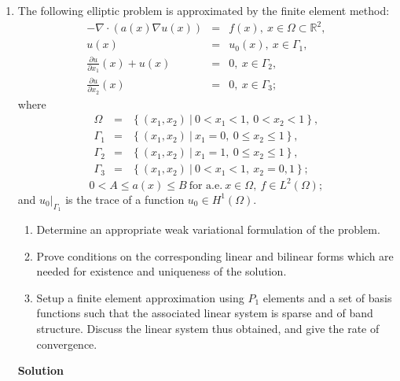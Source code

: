 \documentclass{article}
\begin{document}
\begin{enumerate}
\begin{enumerate}
\end{enumerate}



\item The following elliptic problem is approximated by the finite element method:
\begin{eqnarray*}
-\nabla \cdot \left( a(x) \nabla u(x) \right) & = & f(x), \ x \in \Omega \subset \mathbb{R}^2, \\
u(x) & = & u_0(x), \ x \in \Gamma_1, \\
\frac{\partial u}{\partial x_1}(x) + u(x) & = & 0, \ x \in \Gamma_2, \\
\frac{\partial u}{\partial x_2}(x) & = & 0, \ x \in \Gamma_3;
\end{eqnarray*}
where
\begin{eqnarray*}
\Omega & = & \left\{ (x_1,x_2) \ | \ 0 < x_1 < 1, \ 0 < x_2 < 1 \right\}, \\
\Gamma_1 & = & \left\{ (x_1,x_2) \ | \ x_1 = 0, \ 0 \leq x_2 \leq 1 \right\}, \\
\Gamma_2 & = & \left\{ (x_1,x_2) \ | \ x_1 = 1, \ 0 \leq x_2 \leq 1 \right\}, \\
\Gamma_3 & = & \left\{ (x_1,x_2) \ | \ 0 < x_1 < 1, \ x_2 = 0,1 \right\};
\end{eqnarray*}
\[0 < A \leq a(x) \leq B \ \text{for a.e.} \ x \in \Omega, \ f \in L^2(\Omega);\]
and \(u_0|_{\Gamma_1}\) is the trace of a function \(u_0 \in H^1(\Omega)\).

\begin{enumerate}
\item Determine an appropriate weak variational formulation of the problem.

\item Prove conditions on the corresponding linear and bilinear forms which are needed for existence and uniqueness of the solution.

\item Setup a finite element approximation using \(P_1\) elements and a set of basis functions such that the associated linear system is sparse and of band structure.  Discuss the linear system thus obtained, and give the rate of convergence.

\end{enumerate}

{\bf Solution}


\end{enumerate}
\end{document}
